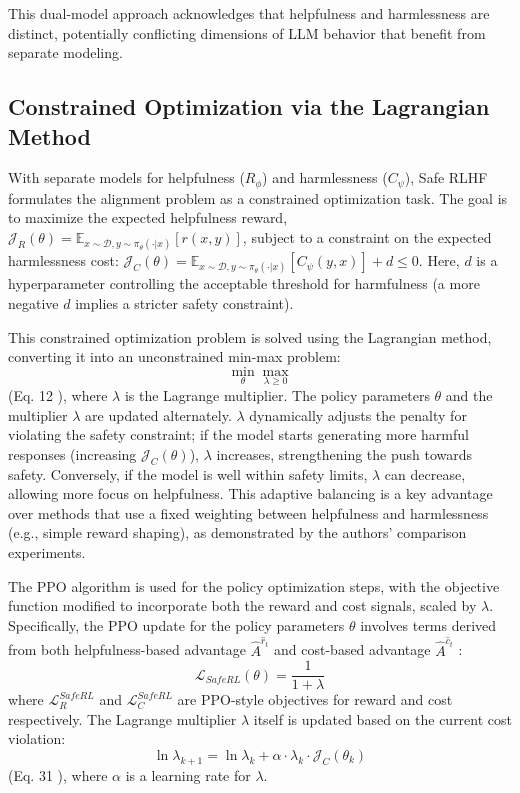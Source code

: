 \documentclass[10pt,journal,compsoc]{IEEEtran} %
\begin{document}
This dual-model approach acknowledges that helpfulness and harmlessness are distinct, potentially conflicting dimensions of LLM behavior that benefit from separate modeling.

\subsection{Constrained Optimization via the Lagrangian Method}
With separate models for helpfulness ($R_\phi$) and harmlessness ($C_\psi$), Safe RLHF formulates the alignment problem as a constrained optimization task. \cite{Dai2023SafeRLHF} The goal is to maximize the expected helpfulness reward, $\mathcal{J}_R(\theta) = \mathbb{E}_{x \sim \mathcal{D}, y \sim \pi_\theta(\cdot|x)}[r(x,y)]$, subject to a constraint on the expected harmlessness cost: $\mathcal{J}_C(\theta) = \mathbb{E}_{x \sim \mathcal{D}, y \sim \pi_\theta(\cdot|x)}[C_\psi(y,x)] + d \le 0$. Here, $d$ is a hyperparameter controlling the acceptable threshold for harmfulness (a more negative $d$ implies a stricter safety constraint).

This constrained optimization problem is solved using the Lagrangian method, converting it into an unconstrained min-max problem:
$$ \min_{\theta} \max_{\lambda \ge 0} $$
(Eq. 12 \cite{Dai2023SafeRLHF}), where $\lambda$ is the Lagrange multiplier. The policy parameters $\theta$ and the multiplier $\lambda$ are updated alternately. $\lambda$ dynamically adjusts the penalty for violating the safety constraint; if the model starts generating more harmful responses (increasing $\mathcal{J}_C(\theta)$), $\lambda$ increases, strengthening the push towards safety. Conversely, if the model is well within safety limits, $\lambda$ can decrease, allowing more focus on helpfulness. This adaptive balancing is a key advantage over methods that use a fixed weighting between helpfulness and harmlessness (e.g., simple reward shaping), as demonstrated by the authors' comparison experiments. \cite{Dai2023SafeRLHF}

The PPO algorithm is used for the policy optimization steps, with the objective function modified to incorporate both the reward and cost signals, scaled by $\lambda$. Specifically, the PPO update for the policy parameters $\theta$ involves terms derived from both helpfulness-based advantage $\hat{A}^{\hat{r}_t}$ and cost-based advantage $\hat{A}^{\hat{c}_t}$ \cite{Dai2023SafeRLHF}:
$$ \mathcal{L}_{SafeRL}(\theta) = \frac{1}{1+\lambda} $$
where $\mathcal{L}_{R}^{SafeRL}$ and $\mathcal{L}_{C}^{SafeRL}$ are PPO-style objectives for reward and cost respectively. The Lagrange multiplier $\lambda$ itself is updated based on the current cost violation:
$$ \ln \lambda_{k+1} = \ln \lambda_k + \alpha \cdot \lambda_k \cdot \mathcal{J}_C(\theta_k) $$
(Eq. 31 \cite{Dai2023SafeRLHF}), where $\alpha$ is a learning rate for $\lambda$.
\end{document}
